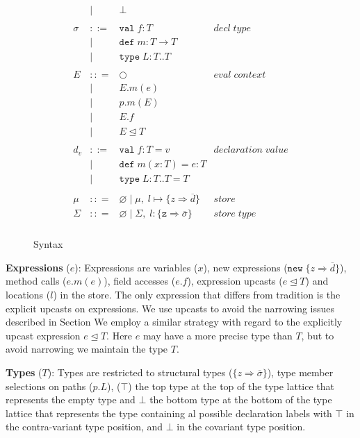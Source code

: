 \documentclass[11pt
              , a4paper
              , twoside
              , openright
              ]{report}
\begin{document}
\begin{figure}[h]
\[\begin{array}{lll}
\begin{array}{lllr}
& | & \bot & \\
&&\\
\sigma & ::= & \texttt{val} \; f:T & decl \; type\\
       & |   & \texttt{def} \; m:T \rightarrow T \\
		 & |   & \texttt{type} \; L : T .. T &\\
&&\\
E & :: = & \bigcirc & eval \; context\\
       & | & E.m(e)\\
       & | & p.m(E)\\
       & | & E.f\\
       & | & E \unlhd T\\
&&\\
d_v & ::= & \texttt{val} \; f : T = v & declaration \; value \\
  & |   & \texttt{def} \; m(x:T) = e : T &\\
  & |   & \texttt{type} \; L : T .. T = T &\\
&&\\
\mu & :: = & \varnothing \; | \; \mu,\; l \mapsto \{z \Rightarrow \overline{d}\} & store \\
\Sigma & :: = & \varnothing \; | \; \Sigma,\; l : \{\texttt{z} \Rightarrow \overline{\sigma}\} & store \; type \\
\end{array}
\end{array}
\]
\caption{Syntax}
\label{f:syntax}
\end{figure}

\textbf{Expressions} ($e$): Expressions are variables ($x$), new 
expressions ($\texttt{new} \; \{z \Rightarrow \overline{d}\}$), 
method calls ($e.m(e)$), field accesses ($e.f$), expression 
upcasts ($e \unlhd T$) and locations ($l$) in the store. The 
only expression that differs from tradition is the explicit upcasts on expressions. 
We use upcasts to avoid the narrowing issues described in Section
We employ a similar strategy with regard to the explicitly 
upcast expression $e \unlhd T$. Here $e$ may have a more precise 
type than $T$, but to avoid narrowing we maintain the type $T$.

\textbf{Types} ($T$): Types are restricted to structural types 
($\{z \Rightarrow \overline{\sigma}\}$), type member selections on 
paths ($p.L$), ($\top$) the top type at the top of the type lattice 
that represents the empty type and $\bot$ the bottom type at the 
bottom of the type lattice that represents the type containing 
al possible declaration labels with $\top$ in the contra-variant 
type position, and $\bot$ in the covariant type position.
\end{document}

